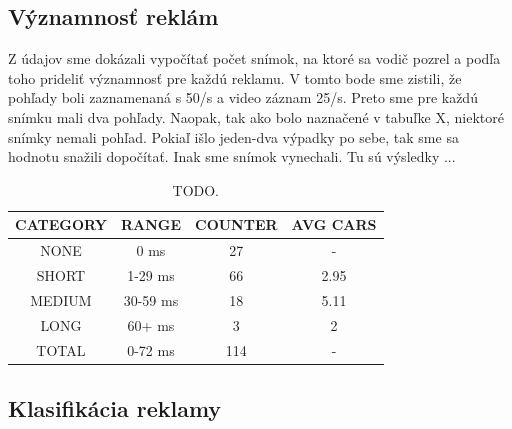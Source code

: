 \subsection{Významnosť reklám}

Z údajov sme dokázali vypočítať počet snímok, na ktoré sa vodič pozrel a podľa toho prideliť významnosť pre každú reklamu. V tomto bode sme zistili, že pohľady boli zaznamenaná s 50/s a video záznam 25/s. Preto sme pre každú snímku mali dva pohľady. Naopak, tak ako bolo naznačené v tabuľke X, niektoré snímky nemali pohľad. Pokiaľ išlo jeden-dva výpadky po sebe, tak sme sa hodnotu snažili dopočítať. Inak sme snímok vynechali. Tu sú výsledky ...


\begin{table}
\centering
\begin{tabular}{|c c c c|}
 \hline
 CATEGORY &	RANGE &	COUNTER &	AVG CARS \\ [0.5ex] 
 \hline
NONE &	0 ms &	27 &	- \\ [0.1ex]
SHORT &	1-29 ms &	66 &	2.95 \\ [0.1ex]
MEDIUM &	30-59 ms &	18 &	5.11 \\ [0.1ex]
LONG &	60+ ms &	3 &	2 \\ [0.1ex]
TOTAL &	0-72 ms	& 114	& - \\ [0.1ex]
 \hline
\end{tabular}
\caption{TODO.}
\label{table:1}
\end{table}

\subsection{Klasifikácia reklamy}



